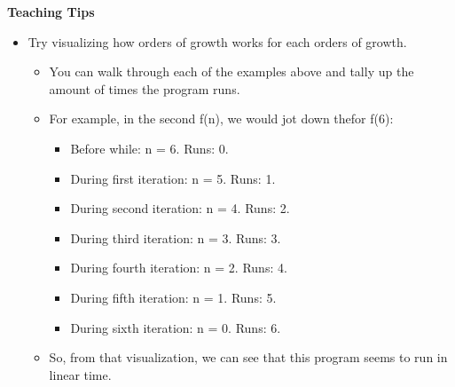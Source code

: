 \begin{guide}
   \textbf{Teaching Tips}
   \begin{itemize}
      \item Try visualizing how orders of growth works for each orders of growth.
      \begin{itemize}
      \item You can walk through each of the examples above and tally up the amount of times the program runs. 
      \item For example, in the second f(n), we would jot down thefor f(6):
      \begin{itemize}
         \item Before while: n = 6. Runs: 0.
         \item During first iteration: n = 5. Runs: 1.
         \item During second iteration: n = 4. Runs: 2.
         \item During third iteration: n = 3. Runs: 3.
         \item During fourth iteration: n = 2. Runs: 4.
         \item During fifth iteration: n = 1. Runs: 5.
         \item During sixth iteration: n = 0. Runs: 6.
      \end{itemize}
      \item So, from that visualization, we can see that this program seems to run in linear time. 
      \end{itemize}
   \end{itemize}
\end{guide}